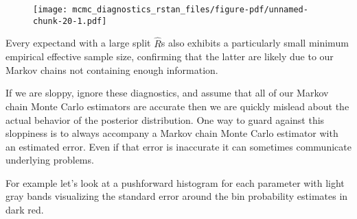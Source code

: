 \documentclass[
  letterpaper,
  DIV=11,
  numbers=noendperiod]{scrartcl}
\newenvironment{Shaded}{\begin{snugshade}}{\end{snugshade}}
\newcommand{\AttributeTok}[1]{\textcolor[rgb]{0.40,0.45,0.13}{#1}}
\newcommand{\DecValTok}[1]{\textcolor[rgb]{0.68,0.00,0.00}{#1}}
\newcommand{\FunctionTok}[1]{\textcolor[rgb]{0.28,0.35,0.67}{#1}}
\newcommand{\NormalTok}[1]{\textcolor[rgb]{0.00,0.23,0.31}{#1}}
\newcommand{\SpecialCharTok}[1]{\textcolor[rgb]{0.37,0.37,0.37}{#1}}
\newcommand{\StringTok}[1]{\textcolor[rgb]{0.13,0.47,0.30}{#1}}
\begin{document}
\begin{figure}[H]

{\centering \texttt{[image: mcmc\_diagnostics\_rstan\_files/figure-pdf/unnamed-chunk-20-1.pdf]}

}

\end{figure}

Every expectand with a large split \(\hat{R}\)s also exhibits a
particularly small minimum empirical effective sample size, confirming
that the latter are likely due to our Markov chains not containing
enough information.

If we are sloppy, ignore these diagnostics, and assume that all of our
Markov chain Monte Carlo estimators are accurate then we are quickly
mislead about the actual behavior of the posterior distribution. One way
to guard against this sloppiness is to always accompany a Markov chain
Monte Carlo estimator with an estimated error. Even if that error is
inaccurate it can sometimes communicate underlying problems.

For example let's look at a pushforward histogram for each parameter
with light gray bands visualizing the standard error around the bin
probability estimates in dark red.

\begin{Shaded}
\end{Shaded}
\end{document}
